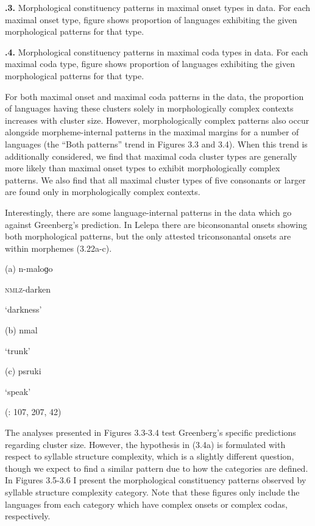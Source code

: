 \textbf{.3.} Morphological constituency patterns in maximal onset types in data. For each maximal onset type, figure shows proportion of languages exhibiting the given morphological patterns for that type.

\textbf{.4.} Morphological constituency patterns in maximal coda types in data. For each maximal coda type, figure shows proportion of languages exhibiting the given morphological patterns for that type.

  For both maximal onset and maximal coda patterns in the data, the proportion of languages having these clusters solely in morphologically complex contexts increases with cluster size. However, morphologically complex patterns also occur alongside morpheme-internal patterns in the maximal margins for a number of languages (the “Both patterns” trend in Figures 3.3 and 3.4). When this trend is additionally considered, we find that maximal coda cluster types are generally more likely than maximal onset types to exhibit morphologically complex patterns. We also find that all maximal cluster types of five consonants or larger are found only in morphologically complex contexts.

  Interestingly, there are some language-internal patterns in the data which go against Greenberg’s prediction. In Lelepa there are biconsonantal onsets showing both morphological patterns, but the only attested triconsonantal onsets are within morphemes (3.22a-c).

\ea\label{ex:(3.22)}

(a)  n-maloɡo

\textsc{nmlz}-darken

\glt ‘darkness’

(b)  nmal

\glt ‘trunk’

(c)  psruki

\glt ‘speak’

(\citealt{Lacrampe2014}: 107, 207, 42)

\z

  The analyses presented in Figures 3.3-3.4 test Greenberg’s specific predictions regarding cluster size. However, the hypothesis in (3.4a) is formulated with respect to syllable structure complexity, which is a slightly different question, though we expect to find a similar pattern due to how the categories are defined. In Figures 3.5-3.6 I present the morphological constituency patterns observed by syllable structure complexity category. Note that these figures only include the languages from each category which have complex onsets or complex codas, respectively.

